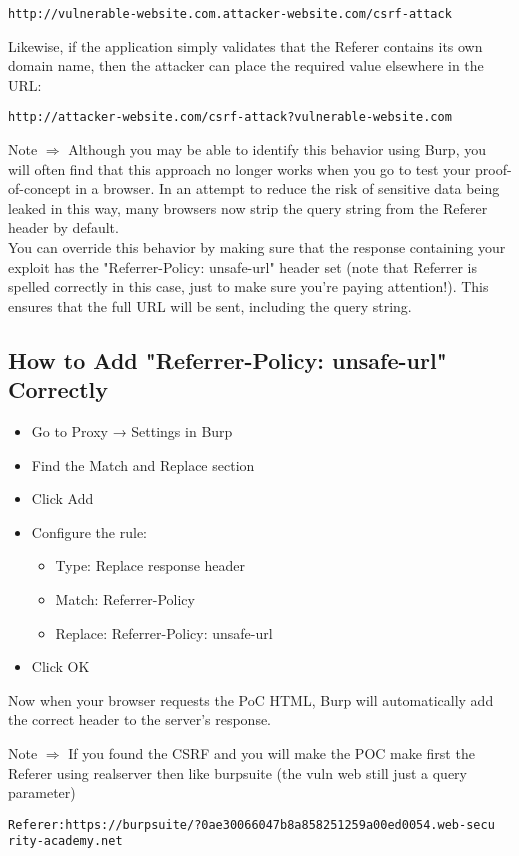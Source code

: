 \documentclass{article}
\begin{document}
\begin{enumerate}
\begin{lstlisting}[frame=single]
http://vulnerable-website.com.attacker-website.com/csrf-attack
\end{lstlisting}
Likewise, if the application simply validates that the Referer contains its own domain name, then the attacker can place the required value elsewhere in the URL: 
\begin{lstlisting}[frame=single]
http://attacker-website.com/csrf-attack?vulnerable-website.com
\end{lstlisting}

Note $\Longrightarrow$  Although you may be able to identify this behavior using Burp, you will often find that this approach no longer works when you go to test your proof-of-concept in a browser. In an attempt to reduce the risk of sensitive data being leaked in this way, many browsers now strip the query string from the Referer header by default.\\

You can override this behavior by making sure that the response containing your exploit has the "Referrer-Policy: unsafe-url" header set (note that Referrer is spelled correctly in this case, just to make sure you're paying attention!). This ensures that the full URL will be sent, including the query string. 

\subsection*{How to Add "Referrer-Policy: unsafe-url" Correctly}
\begin{itemize}
\item Go to Proxy → Settings in Burp
\item Find the Match and Replace section
\item Click Add
\item Configure the rule:
	\begin{itemize}
		\item    Type: Replace response header
		\item   Match: Referrer-Policy
		\item   Replace: Referrer-Policy: unsafe-url
	\end{itemize}
\item Click OK
\end{itemize}
Now when your browser requests the PoC HTML, Burp will automatically add the correct header to the server's response.

Note $\Longrightarrow$ If you found the CSRF and you will make the POC make first the Referer using realserver then like burpsuite (the vuln web still just a query parameter)
\begin{lstlisting}[frame=single]
Referer:https://burpsuite/?0ae30066047b8a858251259a00ed0054.web-secu
rity-academy.net
\end{lstlisting}


\end{enumerate}
\end{document}

